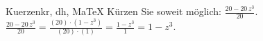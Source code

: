 \begin{MAufgabe}{Kuerzen}{kr, dh, MaTeX}
K\"urzen Sie soweit m\"oglich: $\frac{20 - 20\, z^3}{20}$.\\ 
\ifLsg\MLoesung
\quad $\frac{20 - 20\, z^3}{20}=\frac{(20)\cdot(1 - z^3)}{(20)\cdot(1)}=\frac{1 - z^3}{1}=1 - z^3$.\else\relax\fi
 \end{MAufgabe}
